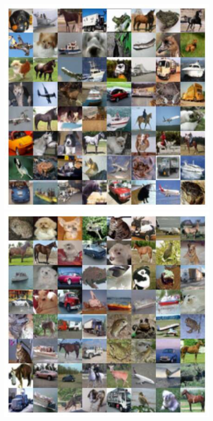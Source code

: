 \begin{figure}[ht!]
  \includegraphics[width=\linewidth]{figs/imgs/ddpm_cifar10_data_samples_T_700.jpg}
\endminipage\hfill
{}
  \includegraphics[width=\linewidth]{figs/imgs/ddpm_cifar10_data_samples_T_600.jpg}

\end{figure}
